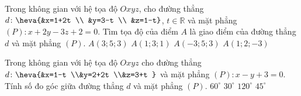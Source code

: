 \begin{ex}%
	Trong không gian với hệ tọa độ $Oxyz$, cho đường thẳng $d\colon \heva{&x=1+2t \\ &y=3-t \\ &z=1-t}$, $t \in \mathbb{R}$ và mặt phẳng $(P)\colon x+2y-3z+2=0$. Tìm tọa độ của điểm $A$ là giao điểm của đường thẳng $d$ và mặt phẳng $(P)$.
	\choice
	{$A(3; 5; 3)$}
	{$A(1; 3; 1)$}
	{\True $A(-3; 5; 3)$}
	{$A(1; 2;-3)$}
\end{ex}
\begin{ex}%
	Trong không gian với hệ tọa độ $Oxyz$ cho đường thẳng $d\colon \heva{&x=1-t \\&y=2+2t \\&z=3+t
	}$ và mặt phẳng $(P)\colon x-y+3=0$. Tính số đo góc giữa đường thẳng $d$ và mặt phẳng $(P)$.
	\choice
	{\True $60^{\circ}$}
	{$30^{\circ}$}
	{$120^{\circ}$}
	{$45^\circ$}
\end{ex}

